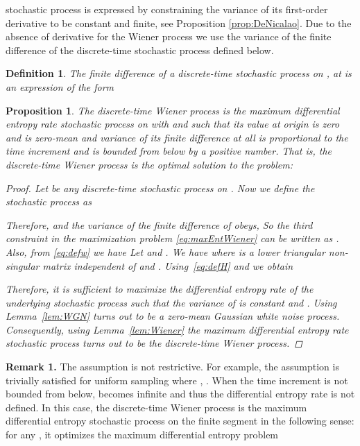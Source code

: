 \documentclass{article}
\newtheorem{mydef}{Definition}
\newtheorem{prop}{Proposition}
\begin{document}
stochastic process is expressed by constraining  the variance of its
first-order derivative  to be constant and finite, see Proposition
\ref{prop:DeNicalao}. Due to the absence of derivative for the
Wiener process we use the variance of the finite difference of the
discrete-time stochastic process defined below.
\begin{mydef} The finite difference of a discrete-time stochastic process  on , at  is an expression of the form

\hfill 
\end{mydef}
\begin{prop}
\label{prop:Wiener} The discrete-time Wiener process is the maximum
differential entropy rate stochastic process on  with
 and   such that its value at origin is zero and is
zero-mean and variance of its finite difference at all
 is proportional to the time increment
 and  is bounded from below by a
positive number. That is, the discrete-time Wiener process is the
optimal solution to the problem:


\begin{proof}
Let   be any discrete-time stochastic process on
. Now we define the stochastic process  as

Therefore,  and the variance of the finite difference of  obeys, 
So the third constraint in the maximization problem
\eqref{eq:maxEntWiener} can be written as
. Also, from \eqref{eq:defw} we
have
Let  and
. We have
 where  is a lower triangular
non-singular matrix independent of  and .
Using~\eqref{eq:defH} and \cite[Corollary to Theorem 8.6.4]{Cover}
we obtain

Therefore, it is sufficient to maximize the differential entropy
rate of the underlying stochastic process  such that the
variance of  is constant and . Using Lemma~\ref{lem:WGN} 
turns out to be a zero-mean Gaussian white noise process. Consequently, using
Lemma~\ref{lem:Wiener} the maximum differential entropy rate
stochastic process  turns out to be the discrete-time Wiener
process.
\end{proof}
\end{prop}

\noindent\textbf{Remark 1.} The assumption  is not restrictive. 
For example, the assumption is trivially satisfied for uniform sampling where  , . 
When the time increment 
is not bounded from below,  becomes infinite and thus the differential entropy rate is
not defined. In this case, the discrete-time Wiener process is the
maximum differential entropy stochastic process on the finite
segment  in the following
sense: for any , it optimizes the maximum
differential entropy problem
\end{document}
